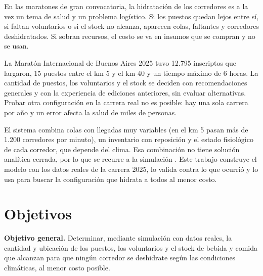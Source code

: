 \documentclass[11pt,a4paper]{article}
\begin{document}
En las maratones de gran convocatoria, la hidratación de los corredores es a la vez un tema de salud y un problema logístico. Si los puestos quedan lejos entre sí, si faltan voluntarios o si el stock no alcanza, aparecen colas, faltantes y corredores deshidratados. Si sobran recursos, el costo se va en insumos que se compran y no se usan.

La Maratón Internacional de Buenos Aires 2025 tuvo 12.795 inscriptos que largaron, 15 puestos entre el km 5 y el km 40 y un tiempo máximo de 6 horas. La cantidad de puestos, los voluntarios y el stock se deciden con recomendaciones generales y con la experiencia de ediciones anteriores, sin evaluar alternativas. Probar otra configuración en la carrera real no es posible: hay una sola carrera por año y un error afecta la salud de miles de personas.

El sistema combina colas con llegadas muy variables (en el km 5 pasan más de 1.200 corredores por minuto), un inventario con reposición y el estado fisiológico de cada corredor, que depende del clima. Esa combinación no tiene solución analítica cerrada, por lo que se recurre a la simulación \cite{lawkelton,winston}. Este trabajo construye el modelo con los datos reales de la carrera 2025, lo valida contra lo que ocurrió y lo usa para buscar la configuración que hidrata a todos al menor costo.

\section{Objetivos}

\textbf{Objetivo general.} Determinar, mediante simulación con datos reales, la cantidad y ubicación de los puestos, los voluntarios y el stock de bebida y comida que alcanzan para que ningún corredor se deshidrate según las condiciones climáticas, al menor costo posible.
\end{document}
